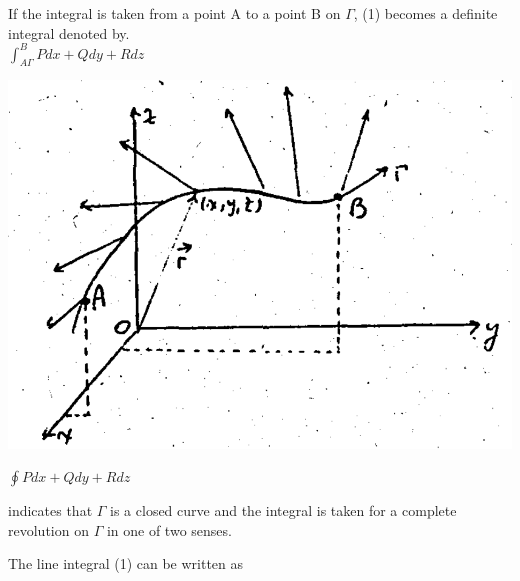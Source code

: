 \documentclass[11pt,reqno]{amsbook}
\begin{document}
    \begin{minipage}{0.6\textwidth}
    \quad If the integral is taken from a point A to a point B on $\Gamma$, (1) becomes a definite integral denoted by. \\
    
    \centering$\int_{A\Gamma}^{B} Pdx + Qdy + Rdz$
	\end{minipage}
	\hfill
	\begin{minipage}{0.4\textwidth}
	\includegraphics[width=\textwidth]{images/b2p2-362-fig01.png}
	\end{minipage}
	
	\begin{center}
        $\oint Pdx + Qdy + Rdz$
    \end{center}
	
	\begin{flushleft}
	    indicates that $\Gamma$ is a closed curve and the integral is taken for a complete revolution on $\Gamma$ in one of two senses.
	\end{flushleft}
	
	The line integral (1) can be written as 
\end{document}
